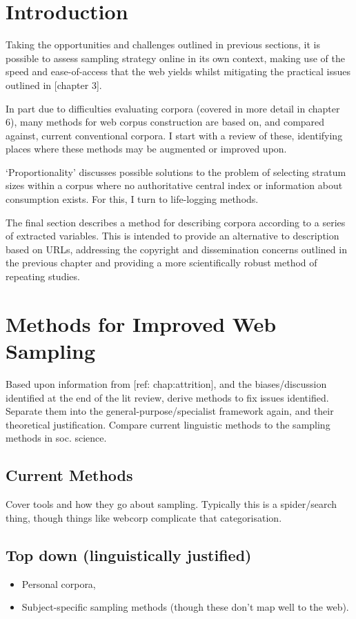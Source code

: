 
\section{Introduction}
Taking the opportunities and challenges outlined in previous sections, it is possible to assess sampling strategy online in its own context, making use of the speed and ease-of-access that the web yields whilst mitigating the practical issues outlined in [chapter 3].

In part due to difficulties evaluating corpora (covered in more detail in chapter 6), many methods for web corpus construction are based on, and compared against, current conventional corpora.  I start with a review of these, identifying places where these methods may be augmented or improved upon.

`Proportionality' discusses possible solutions to the problem of selecting stratum sizes within a corpus where no authoritative central index or information about consumption exists.  For this, I turn to life-logging methods.

The final section describes a method for describing corpora according to a series of extracted variables.  This is intended to provide an alternative to description based on URLs, addressing the copyright and dissemination concerns outlined in the previous chapter and providing a more scientifically robust method of repeating studies.



\section{Methods for Improved Web Sampling}
Based upon information from [ref: chap:attrition], and the biases/discussion identified at the end of the lit review, derive methods to fix issues identified.  Separate them into the general-purpose/specialist framework again, and their theoretical justification.  Compare current linguistic methods to the sampling methods in soc. science.

\subsection{Current Methods}
Cover tools and how they go about sampling.  Typically this is a spider/search thing, though things like webcorp complicate that categorisation.


\subsection{Top down (linguistically justified)}
\begin{itemize}
    \item Personal corpora,
    \item Subject-specific sampling methods (though these don't map well to the web).
\end{itemize}
